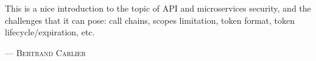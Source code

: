 This is a nice introduction to the topic of API and microservices security, and the challenges that it can pose: call chains, scopes limitation, token format, token lifecycle/expiration, etc.
\setlength{\parindent}{0cm}\par\textsc{ --- Bertrand Carlier }\par\vspace{12pt}\setlength{\parindent}{15pt}
